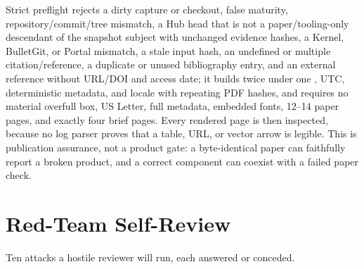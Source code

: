 \documentclass[journal]{IEEEtran}
\newcommand{\code}[1]{\texttt{\detokenize{#1}}}
\begin{document}
Strict preflight rejects a dirty capture or checkout, false maturity,
repository/commit/tree mismatch, a Hub head that is not a paper/tooling-only
descendant of the snapshot subject with unchanged evidence hashes, a Kernel,
BulletGit, or Portal mismatch, a stale input hash, an undefined or multiple
citation/reference, a duplicate or unused bibliography entry, and an external
reference without URL/DOI and access date; it builds twice under one
\code{SOURCE_DATE_EPOCH}, UTC, deterministic metadata, and locale with
repeating PDF hashes, and requires no material overfull box, US Letter, full
metadata, embedded fonts, 12--14 paper pages, and exactly four brief pages.
Every rendered page is then inspected, because no log parser proves that a
table, URL, or vector arrow is legible. This is publication assurance, not a
product gate: a byte-identical paper can faithfully report a broken product,
and a correct component can coexist with a failed paper check.

\balance




\section{Red-Team Self-Review}
\label{app:redteam}

Ten attacks a hostile reviewer will run, each answered or conceded.
\end{document}
